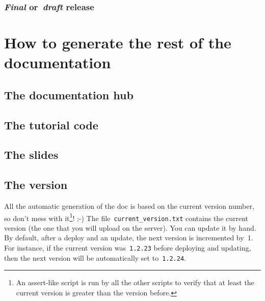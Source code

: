 \documentclass[a4paper,10pt]{article}
\begin{document}
\subsubsection{\emph{Final} or~\emph{draft} release}
\label{final_draft_mode}

\section{How to generate the rest of the documentation}
\label{generate_documentation}


\subsection{The documentation hub}
\label{generate_documentation_hub}

\subsection{The tutorial code}

\subsection{The slides}

\subsection{The version}

All the automatic generation of the doc is based on the current version number, so don't mess with it\footnote{An assert-like script is run by all the other scripts to verify that at least the current version is
greater than the version before.}! ;-) 
The file~\verb+current_version.txt+ contains the current version (the one that you will upload on the server). You can update it by hand. By default, after a deploy and an update, the next version is incremented by~$1$. For instance, if the current version was~\verb+1.2.23+ before deploying and updating, then the next version will be automatically set to~\verb+1.2.24+.\\
\end{document}
